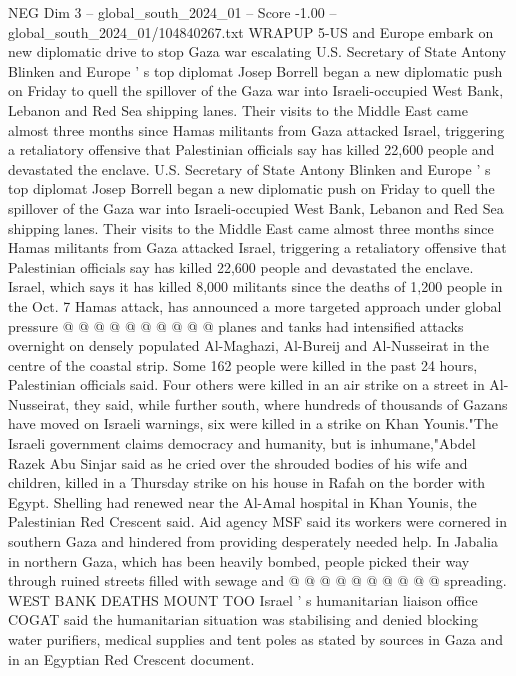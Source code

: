\begin{textsample}{NEG Dim 3 – global\_south\_2024\_01 – Score -1.00 – global\_south\_2024\_01/104840267.txt}  \label{ex:f3_neg_072}
WRAPUP 5-US and Europe embark on new diplomatic drive to stop Gaza war escalating U.S.
Secretary of State Antony Blinken and Europe ' s top diplomat Josep Borrell began a new diplomatic push on Friday to quell the spillover of the Gaza war into Israeli-occupied West Bank, Lebanon and Red Sea shipping lanes.
Their visits to the Middle East came almost three months since Hamas militants from Gaza attacked Israel, triggering a retaliatory offensive that Palestinian officials say has killed 22,600 people and devastated the enclave.
U.S.
Secretary of State Antony Blinken and Europe ' s top diplomat Josep Borrell began a new diplomatic push on Friday to quell the spillover of the Gaza war into Israeli-occupied West Bank, Lebanon and Red Sea shipping lanes.
Their visits to the Middle East came almost three months since Hamas militants from Gaza attacked Israel, triggering a retaliatory offensive that Palestinian officials say has killed 22,600 people and devastated the enclave.
Israel, which says it has killed 8,000 militants since the deaths of 1,200 people in the Oct. 7 Hamas attack, has announced a more targeted approach under global pressure @ @ @ @ @ @ @ @ @ @ planes and tanks had intensified attacks overnight on densely populated Al-Maghazi, Al-Bureij and Al-Nusseirat in the centre of the coastal strip.
Some 162 people were killed in the past 24 hours, Palestinian officials said.
Four others were killed in an air strike on a street in Al-Nusseirat, they said, while further south, where hundreds of thousands of Gazans have moved on Israeli warnings, six were killed in a strike on Khan Younis."The Israeli government claims democracy and humanity, but is inhumane,"Abdel Razek Abu Sinjar said as he cried over the shrouded bodies of his wife and children, killed in a Thursday strike on his house in Rafah on the border with Egypt.
Shelling had renewed near the Al-Amal hospital in Khan Younis, the Palestinian Red Crescent said.
Aid agency MSF said its workers were cornered in southern Gaza and hindered from providing desperately needed help.
In Jabalia in northern Gaza, which has been heavily bombed, people picked their way through ruined streets filled with sewage and @ @ @ @ @ @ @ @ @ @ spreading.
WEST BANK DEATHS MOUNT TOO Israel ' s humanitarian liaison office COGAT said the humanitarian situation was stabilising and denied blocking water purifiers, medical supplies and tent poles as stated by sources in Gaza and in an Egyptian Red Crescent document.

\end{textsample}
